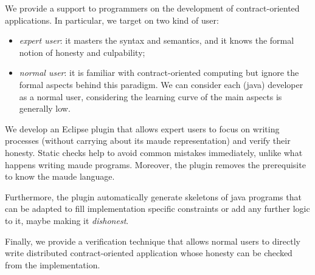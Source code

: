 We provide a support to programmers on the development of contract-oriented 
applications. In particular, we target on two kind of user:
\begin{itemize}
\item \emph{expert user}: it masters the \coco syntax and semantics, and it knows the formal notion of honesty and culpability; 

\item \emph{normal user}: it is familiar with contract-oriented computing but ignore
the formal aspects behind this paradigm. We can consider each (java) developer as
a normal user, considering the learning curve of the main aspects is generally low.
\end{itemize}

We develop an Eclipse plugin that allows expert users to focus on writing
\coco processes (without carrying about its maude representation) and verify their honesty.
Static checks help to avoid common
mistakes immediately, unlike what happens writing maude programs.
Moreover, the plugin removes the prerequisite to know the maude language.

Furthermore, the plugin automatically generate skeletons of java programs that
can be adapted to fill implementation specific constraints or add any further 
logic to it, maybe making it \emph{dishonest}.

Finally, we provide a verification technique that allows normal users
to directly write distributed contract-oriented application whose
honesty can be checked from the implementation.

